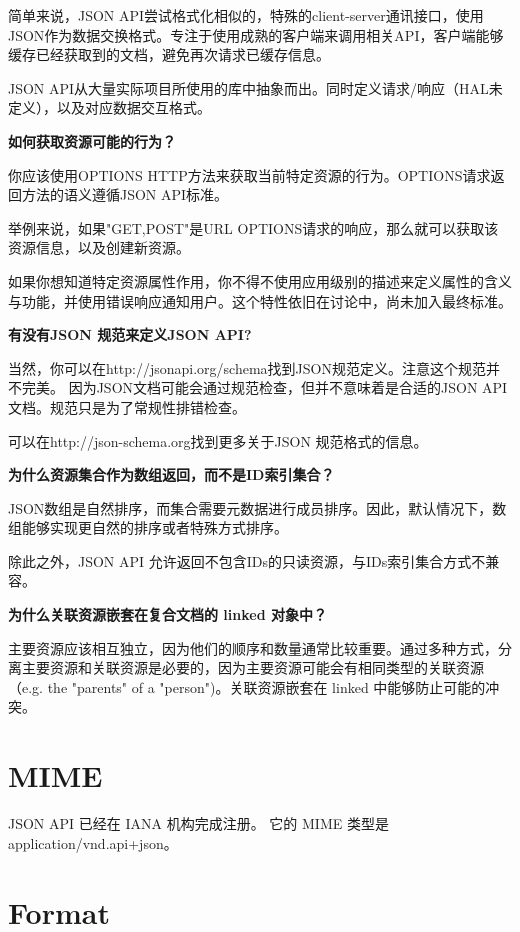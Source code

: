 简单来说，JSON API尝试格式化相似的，特殊的client-server通讯接口，使用JSON作为数据交换格式。专注于使用成熟的客户端来调用相关API，客户端能够缓存已经获取到的文档，避免再次请求已缓存信息。

JSON API从大量实际项目所使用的库中抽象而出。同时定义请求/响应（HAL未定义），以及对应数据交互格式。

\textbf{如何获取资源可能的行为？}

你应该使用OPTIONS HTTP方法来获取当前特定资源的行为。OPTIONS请求返回方法的语义遵循JSON API标准。

举例来说，如果"GET,POST"是URL OPTIONS请求的响应，那么就可以获取该资源信息，以及创建新资源。

如果你想知道特定资源属性作用，你不得不使用应用级别的描述来定义属性的含义与功能，并使用错误响应通知用户。这个特性依旧在讨论中，尚未加入最终标准。

\textbf{有没有JSON 规范来定义JSON API?}

当然，你可以在http://jsonapi.org/schema找到JSON规范定义。注意这个规范并不完美。 因为JSON文档可能会通过规范检查，但并不意味着是合适的JSON API文档。规范只是为了常规性排错检查。

可以在http://json-schema.org找到更多关于JSON 规范格式的信息。

\textbf{为什么资源集合作为数组返回，而不是ID索引集合？}

JSON数组是自然排序，而集合需要元数据进行成员排序。因此，默认情况下，数组能够实现更自然的排序或者特殊方式排序。

除此之外，JSON API 允许返回不包含IDs的只读资源，与IDs索引集合方式不兼容。

\textbf{为什么关联资源嵌套在复合文档的 linked 对象中？}

主要资源应该相互独立，因为他们的顺序和数量通常比较重要。通过多种方式，分离主要资源和关联资源是必要的，因为主要资源可能会有相同类型的关联资源（e.g. the "parents" of a "person")。关联资源嵌套在 linked 中能够防止可能的冲突。



\section{MIME}


JSON API 已经在 IANA 机构完成注册。 它的 MIME 类型是 application/vnd.api+json。


\section{Format}

